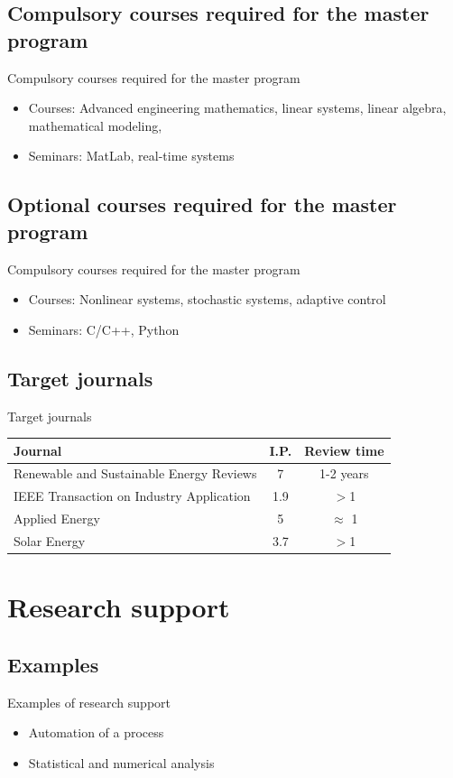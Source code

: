 \documentclass{beamer}
\begin{document}
\subsection{Compulsory courses required for the master program}
\begin{frame}{Compulsory courses required for the master program}
	\begin{itemize}
		\item Courses: Advanced engineering mathematics, linear systems, linear algebra, mathematical modeling,
		\item Seminars: MatLab, real-time systems
	\end{itemize}
\end{frame}
\subsection{Optional courses required for the master program}
\begin{frame}{Compulsory courses required for the master program}
	\begin{itemize}
		\item Courses: Nonlinear systems, stochastic systems, adaptive control
		\item Seminars: C/C++, Python
	\end{itemize}
\end{frame}
\subsection{Target journals}
\begin{frame}{Target journals}
	\begin{tabular}{|p{7cm}|c|c|}
		\hline
		\textbf{Journal} & \textbf{I.P.} & \textbf{Review time} \\ \hline
		Renewable and Sustainable Energy Reviews & 7 & 1-2 years \\ \hline
		IEEE Transaction on Industry Application & 1.9 &  $>$1  \\ \hline
		Applied Energy & 5 & $\approx$ 1 \\ \hline
		Solar Energy & 3.7 & $>$1 \\ \hline
	\end{tabular}
\end{frame}
\section{Research support}
\subsection{Examples}
\begin{frame}{Examples of research support}
	\begin{itemize}
		\item Automation of a process
		\item Statistical and numerical analysis
	\end{itemize}
\end{frame}
\end{document}
